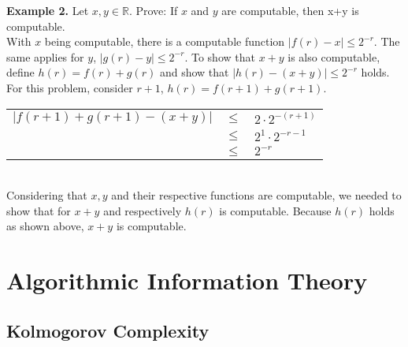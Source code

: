 \documentclass[11pt]{article}
\begin{document}
{\bf Example 2.} Let $x,y\in\mathbb{R}$. Prove: If $x$ and $y$ are computable, then x+y is computable.\\

With $x$ being computable, there is a computable function $|f(r)-x|\leqslant 2^{-r}$. The same applies for $y$, $|g(r)-y|\leqslant 2^{-r}$. To show that $x+y$ is also computable, define $h(r)=f(r)+g(r)$ and show that $|h(r)-(x+y)|\leqslant 2^{-r}$ holds. For this problem, consider $r+1$, $h(r)=f(r+1)+g(r+1)$. 
\begin{tabular}{rcl}
$|f(r+1)+g(r+1)-(x+y)|$ & $\leqslant$ & $2 \cdot 2^{-(r+1)}$ \\
& $\leqslant$ & $2^1 \cdot 2^{-r-1}$ \\
& $\leqslant$ & $2^{-r}$
\end{tabular} \\
Considering that $x,y$ and their respective functions are computable, we needed to show that for $x+y$ and respectively $h(r)$ is computable. Because $h(r)$ holds as shown above, $x+y$ is computable. 

\section{Algorithmic Information Theory}

\subsection{Kolmogorov Complexity}
\end{document}
